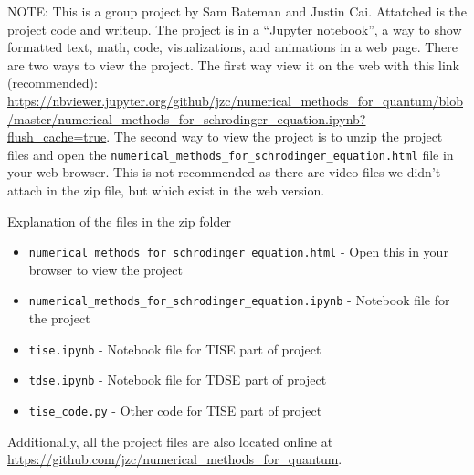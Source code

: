 \documentclass{article}
\begin{document}
NOTE: This is a group project by Sam Bateman and Justin Cai. 
Attatched is the project code and writeup. 
The project is in a ``Jupyter notebook'', 
a way to show formatted text, math, code, visualizations, and animations in a web page.
There are two ways to view the project. The first way view it on the web with this link (recommended): 
\url{https://nbviewer.jupyter.org/github/jzc/numerical_methods_for_quantum/blob/master/numerical_methods_for_schrodinger_equation.ipynb?flush_cache=true}.
The second way to view the project is to unzip the project files and open the 
\verb|numerical_methods_for_schrodinger_equation.html| 
file in your web browser. This is not recommended as there are video files we didn't attach in 
the zip file, but which exist in the web version.

Explanation of the files in the zip folder

\begin{itemize}
    \item \verb|numerical_methods_for_schrodinger_equation.html| - Open this in your browser to view the project 
    \item \verb|numerical_methods_for_schrodinger_equation.ipynb| - Notebook file for the project 
    \item \verb|tise.ipynb|    - Notebook file for TISE part of project 
    \item \verb|tdse.ipynb|  - Notebook file for TDSE part of project 
    \item \verb|tise_code.py| - Other code for TISE part of project 
\end{itemize}

Additionally, all the project files are also located online at 
\url{https://github.com/jzc/numerical_methods_for_quantum}.
\end{document}
